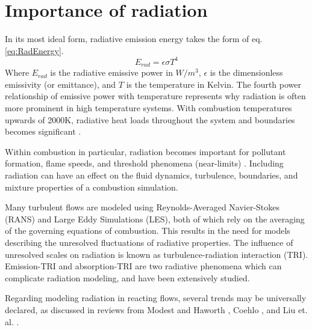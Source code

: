 \section{Importance of radiation}
In its most ideal form, radiative emission energy takes the form of eq. \ref{eq:RadEnergy}.
\begin{equation}
    E_{rad}=\epsilon{}\sigma{}T^4
    \label{eq:RadEnergy}
\end{equation}
Where $E_{rad}$ is the radiative emissive power in $W/m^3$, $\epsilon{}$ is the dimensionless emissivity (or emittance), and $T$ is the temperature in Kelvin. 
The fourth power relationship of emissive power with temperature represents why radiation is often more prominent in high temperature systems. With combustion temperatures upwards of 2000K, radiative heat loads throughout the system and boundaries becomes significant \cite{Modest2016RadiativeSystems}.

Within combustion in particular, radiation becomes important for pollutant formation, flame speeds, and threshold phenomena (near-limits) \cite{Modest2016RadiativeSystems,Coelho2018RadiativeSystems,Liu2020TheFlames}. Including radiation can have an effect on the fluid dynamics, turbulence, boundaries, and mixture properties of a combustion simulation.

Many turbulent flows are modeled using Reynolds-Averaged Navier-Stokes (RANS) and Large Eddy Simulations (LES), both of which rely on the averaging of the governing equations of combustion. This results in the need for models describing the unresolved fluctuations of radiative properties. The influence of unresolved scales on radiation is known as turbulence-radiation interaction (TRI). Emission-TRI and absorption-TRI are two radiative phenomena which can complicate radiation modeling, and have been extensively studied.

Regarding modeling radiation in reacting flows, several trends may be universally declared, as discussed in reviews from Modest and Haworth \cite{Modest2016RadiativeSystems}, Coehlo \cite{Coelho2018RadiativeSystems}, and Liu et. al. \cite{Liu2020TheFlames}.

